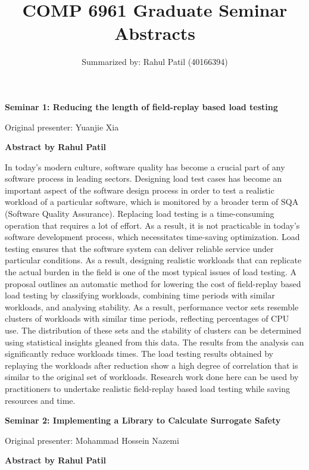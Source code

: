 \documentclass[12pt,letterpaper]{report}
\begin{document}
\title{COMP	6961 Graduate Seminar Abstracts}
\author{Summarized by: Rahul Patil (40166394)}
\maketitle




\begin{center}
    \textbf{Seminar 1: Reducing the length of field-replay based load testing}
        
    \vspace{1em}
    Original presenter: Yuanjie Xia
       
    \vspace{2em}
    \textbf{Abstract by Rahul Patil}
\end{center}

In today's modern culture, software quality has become a crucial part of any software process in leading sectors. Designing load test cases has become an important aspect of the software design process in order to test a realistic workload of a particular software, which is monitored by a broader term of SQA (Software Quality Assurance). Replacing load testing is a time-consuming operation that requires a lot of effort. As a result, it is not practicable in today's software development process, which necessitates time-saving optimization. Load testing ensures that the software system can deliver reliable service under particular conditions. As a result, designing realistic workloads that can replicate the actual burden in the field is one of the most typical issues of load testing. A proposal outlines an automatic method for lowering the cost of field-replay based load testing by classifying workloads, combining time periods with similar workloads, and analysing stability. As a result, performance vector sets resemble clusters of workloads with similar time periods, reflecting percentages of CPU use. The distribution of these sets and the stability of clusters can be determined using statistical insights gleaned from this data. The results from the analysis can significantly reduce workloads times. The load testing results obtained by replaying the workloads after reduction show a high degree of correlation that is similar to the original set of workloads. Research work done here can be used by practitioners to undertake realistic field-replay based load testing while saving resources and time.


\newpage
\begin{center}
    \textbf{Seminar 2: Implementing a Library to Calculate Surrogate Safety}
        
    \vspace{1em}
    Original presenter: Mohammad Hossein Nazemi
   
    \vspace{2em}
    \textbf{Abstract by Rahul Patil}
\end{center}
\end{document}
